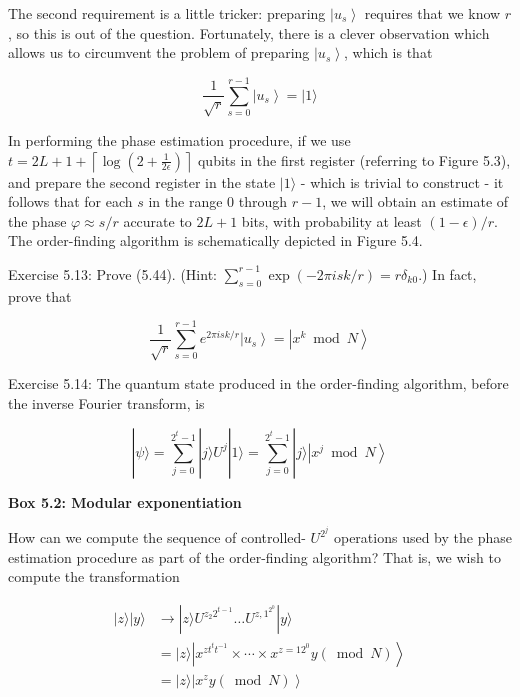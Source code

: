 The second requirement is a little tricker: preparing $\left|u_{s}\right\rangle$ requires that we know $r$, so this is out of the question. Fortunately, there is a clever observation which allows us to circumvent the problem of preparing $\left|u_{s}\right\rangle$, which is that

\begin{equation}
    \frac{1}{\sqrt{r}} \sum_{s=0}^{r-1}\left|u_{s}\right\rangle=|1\rangle \tag{5.44}
\end{equation}

In performing the phase estimation procedure, if we use $t=2 L+1+\left\lceil\log \left(2+\frac{1}{2 \epsilon}\right)\right\rceil$ qubits in the first register (referring to Figure 5.3), and prepare the second register in the state $|1\rangle$ - which is trivial to construct - it follows that for each $s$ in the range 0 through $r-1$, we will obtain an estimate of the phase $\varphi \approx s / r$ accurate to $2 L+1$ bits, with probability at least $(1-\epsilon) / r$. The order-finding algorithm is schematically depicted in Figure 5.4.

Exercise 5.13: Prove (5.44). (Hint: $\sum_{s=0}^{r-1} \exp (-2 \pi i s k / r)=r \delta_{k 0}$.) In fact, prove that

\begin{equation}
    \frac{1}{\sqrt{r}} \sum_{s=0}^{r-1} e^{2 \pi i s k / r}\left|u_{s}\right\rangle=\left|x^{k} \bmod N\right\rangle \tag{5.45}
\end{equation}

Exercise 5.14: The quantum state produced in the order-finding algorithm, before the inverse Fourier transform, is

\begin{equation}
    |\psi\rangle=\sum_{j=0}^{2^{t}-1}|j\rangle U^{j}|1\rangle=\sum_{j=0}^{2^{t}-1}|j\rangle\left|x^{j} \bmod N\right\rangle \tag{5.46}
\end{equation}

\textbf{Box 5.2: Modular exponentiation}

How can we compute the sequence of controlled- $U^{2^{j}}$ operations used by the phase estimation procedure as part of the order-finding algorithm? That is, we wish to compute the transformation

\begin{align}
|z\rangle|y\rangle & \rightarrow|z\rangle U^{z_{2} 2^{t-1}} \ldots U^{z, 1^{2^{0}}}|y\rangle  \tag{5.40}\\
& =|z\rangle\left|x^{z t^{t} t^{-1}} \times \cdots \times x^{z=12^{0}} y(\bmod N)\right\rangle  \tag{5.41}\\
& =|z\rangle\left|x^{z} y(\bmod N)\right\rangle  \tag{5.42}
\end{align}

